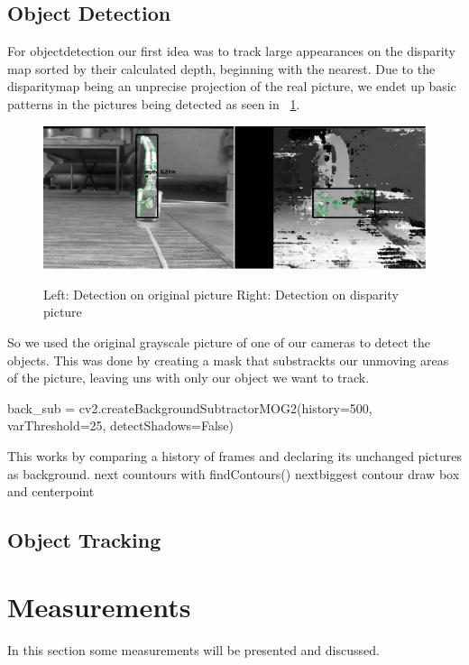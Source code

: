 \documentclass[journal,onecolumn]{IEEEtran}
\begin{document}
\subsection{Object Detection}
\noindent For objectdetection our first idea was to track large appearances on the disparity map sorted by their calculated depth, beginning with the nearest. Due to the disparitymap being an unprecise projection of the real picture, we endet up basic patterns in the pictures being detected as seen in ~\ref{tracking}.
\begin{figure}[H]
	\centering
	\includegraphics[scale=0.5]{handstand_comparison.png}
	\label{tracking}
	\caption{Left: Detection on original picture Right: Detection on disparity picture }
\end{figure}
 So we used the original grayscale picture of one of our cameras to detect the objects. This was done by creating a mask that substrackts our unmoving areas of the picture, leaving uns with only our object we want to track.
\begin{python}
back_sub = cv2.createBackgroundSubtractorMOG2(history=500, varThreshold=25, detectShadows=False)
\end{python}
This works by comparing a history of frames and declaring its unchanged pictures as background. \newline
next countours with findContours()
nextbiggest contour draw box and centerpoint

\subsection{Object Tracking}
\noindent
\section{Measurements}
\noindent In this section some measurements will be presented and discussed.
\end{document}
